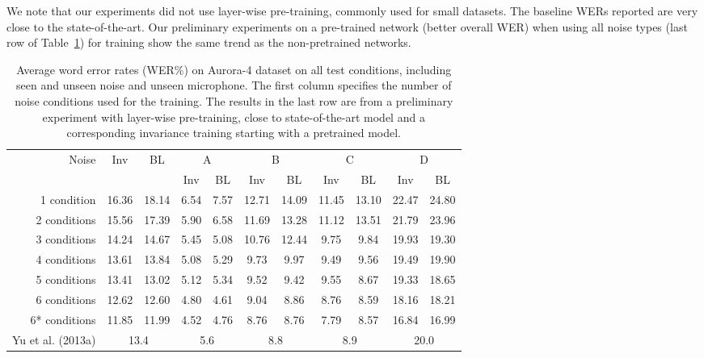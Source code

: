 \documentclass[a4paper]{article}
\begin{document}
We note that our experiments did not use layer-wise pre-training, commonly used for small
datasets. The baseline WERs reported are very close to the state-of-the-art. 
Our preliminary experiments on a pre-trained network (better overall WER) when 
using all noise types (last row of Table~\ref{tab:results}) for training show 
the same trend as the non-pretrained networks.
\begin{table}[t]
    \centering
    \caption{Average word error rates (WER\%) on Aurora-4 dataset on all test conditions,
        including seen and unseen noise and unseen microphone. The first column
        specifies the number of noise conditions used for the training. The
        results in the last row are from a preliminary experiment with
        layer-wise pre-training, close to state-of-the-art
        model and a corresponding invariance training starting with a pretrained model.}
    \label{tab:results}
    \begin{tabular}{r|cc||cc|cc|cc|cc}
        Noise       &Inv&BL&  \multicolumn{2}{c|}{A} & \multicolumn{2}{c|}{B} & \multicolumn{2}{c|}{C} & \multicolumn{2}{c}{D}\\
               & & &  Inv & BL & Inv & BL & Inv & BL & Inv & BL\\
    \hline
    1 condition           &16.36        &18.14 &6.54&7.57    &12.71& 14.09   & 11.45&   13.10    & 22.47 &   24.80    \\
    2 conditions           &15.56        &17.39 &5.90&  6.58 &   11.69   &13.28   &11.12   &13.51   &21.79   &23.96 \\
    3 conditions           &14.24        &14.67 &5.45 & 5.08&    10.76&   12.44&   9.75&    9.84 &   19.93&   19.30\\
    4 conditions           &13.61        &13.84 & 5.08 &5.29    &9.73    &9.97    &9.49    &9.56    &19.49   &19.90\\         
    5 conditions           &13.41        &13.02 & 5.12 &5.34    &9.52    &9.42    &9.55    &8.67    &19.33   &18.65\\         
    6 conditions           &12.62        &12.60 & 4.80 &4.61    &9.04    &8.86    &8.76    &8.59    &18.16   &18.21\\
    \hline\hline
    6* conditions &11.85        &11.99    &4.52    &4.76    &8.76    &8.76    &7.79    &8.57    &16.84&    16.99\\
    \hline\hline
     Yu et al. (2013a)  &\multicolumn{2}{c|}{13.4} & \multicolumn{2}{c|}{5.6} & \multicolumn{2}{c|}{8.8} &\multicolumn{2}{c|}{8.9}&\multicolumn{2}{c}{20.0}
    \end{tabular}
\end{table}
\end{document}
